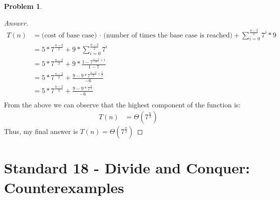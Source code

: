 \documentclass[11pt]{article}
\theoremstyle{definition}
\theoremstyle{definition}
\newtheorem{required}{Problem}
\theoremstyle{definition}
\begin{document}
\begin{required}
\begin{enumerate}
\begin{proof}[Answer]
\begin{align*}
T(n) &= \textrm{(cost of base case) · (number of times the base case is reached)} + \sum_{i=0}^{\frac{n-2}{2}} 7^{i} * 9 \\
&= 5 * 7^{\frac{n-2}{2}} + 9 *  \sum_{i=0}^{\frac{n-2}{2}} 7^{i} \\
&= 5 * 7^{\frac{n-2}{2}} + 9 * \frac{1 - 7^{\frac{n-2}{2}+1}}{1-7} \\
&= 5 * 7^{\frac{n-2}{2}} + \frac{9 - 9*7^{\frac{n-2}{2}+\frac{2}{2}}}{-6} \\
&= 5 * 7^{\frac{n-2}{2}}  + \frac{9-9*7^{\frac{n}{2}}}{-6} \\
\end{align*}
From the above we can observe that the highest component of the function is: \\
\begin{align*}
T(n) &= \Theta(7^{\frac{n}{2}})
\end{align*}
Thus, my final answer is $T(n) = \Theta(7^{\frac{n}{2}})$
\end{proof}
\end{enumerate}
\end{required}

\newpage
\section{Standard 18 - Divide and Conquer: Counterexamples}
\end{document}
